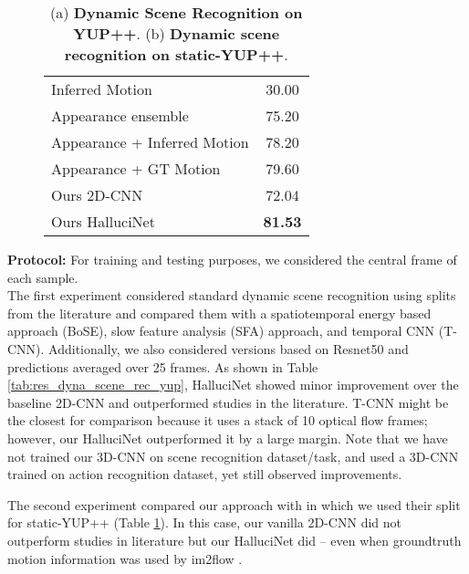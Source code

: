 \documentclass[10pt,twocolumn,letterpaper]{article}
\begin{document}
{\begin{table}
\begin{subfigure}[t]{\columnwidth}
\begin{tabular}{lc}
Inferred Motion \cite{im2flow}              & 30.00             \\
Appearance ensemble \cite{im2flow}          & 75.20             \\
Appearance + Inferred Motion \cite{im2flow}  & 78.20             \\
Appearance + GT Motion \cite{im2flow}        & 79.60             \\
\midrule
Ours 2D-CNN              & 72.04             \\
Ours HalluciNet     & \textbf{81.53}   \\ \bottomrule         
\end{tabular}
\caption{}
\label{tab:res_dyn_scene_yup_static}
\end{subfigure}
\caption{(a) \textbf{Dynamic Scene Recognition on YUP++}. (b) \textbf{Dynamic scene recognition on static-YUP++}.}
\end{table}} 
\noindent\textbf{Protocol:} For training and testing purposes, we considered the central frame of each sample. \\

The first experiment considered standard dynamic scene recognition using splits from the literature and compared them with a spatiotemporal energy based approach (BoSE), slow feature analysis (SFA) approach, and temporal CNN (T-CNN). Additionally, we also considered versions based on Resnet50 and predictions averaged over 25 frames. As shown in Table \ref{tab:res_dyna_scene_rec_yup}, HalluciNet showed minor improvement over the baseline 2D-CNN and outperformed studies in the literature. T-CNN might be the closest for comparison because it uses a stack of 10 optical flow frames; however, our HalluciNet outperformed it by a large margin. Note that we have not trained our 3D-CNN on scene recognition dataset/task, and used a 3D-CNN trained on action recognition dataset, yet still observed improvements.

The second experiment compared our approach with \cite{im2flow} in which we used their split for static-YUP++ (Table \ref{tab:res_dyn_scene_yup_static}).  In this case, our vanilla 2D-CNN did not outperform studies in literature but our HalluciNet did -- even when groundtruth motion information was used by im2flow \cite{im2flow}.  
\end{document}
